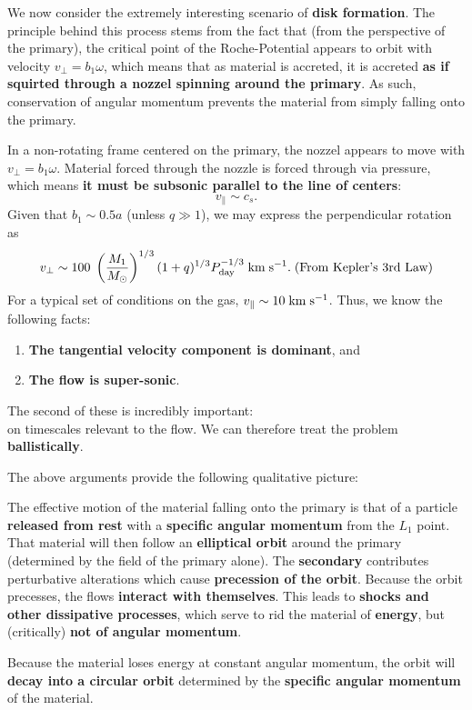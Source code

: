 We now consider the extremely interesting scenario of \textbf{disk formation}. The principle behind this process stems from the fact that (from the perspective of the primary), the critical point of the Roche-Potential appears to orbit with velocity $v_\perp = b_1\omega$, which means that as material is accreted, it is accreted \textbf{as if squirted through a nozzel spinning around the primary}. As such, conservation of angular momentum prevents the material from simply falling onto the primary.
\par
In a non-rotating frame centered on the primary, the nozzel appears to move with $v_\perp = b_1\omega$. Material forced through the nozzle is forced through via pressure, which means \textbf{it must be subsonic parallel to the line of centers}:
\[
v_\parallel \sim c_s.
\]
Given that $b_1 \sim 0.5a$ (unless $q \gg 1$), we may express the perpendicular rotation as
\[
v_\perp \sim 100\; \left(\frac{M_1}{M_\odot}\right)^{1/3} (1+q)^{1/3} P_{\rm day}^{-1/3} \;{\rm km\;s^{-1}}.\;\text{(From Kepler's 3rd Law)}
\]
For a typical set of conditions on the gas, $v_\parallel \sim 10\;{\rm km\;s^{-1}}$. Thus, we know the following facts:
\begin{enumerate}
    \item \textbf{The tangential velocity component is dominant}, and
    \item \textbf{The flow is super-sonic}.
\end{enumerate}
The second of these is incredibly important:\\
 on timescales relevant to the flow. We can therefore treat the problem \textbf{ballistically}.
\par
The above arguments provide the following qualitative picture:
\vspace{0.5cm}
\begin{bigidea}
    The effective motion of the material falling onto the primary is that of a particle \textbf{released from rest} with a \textbf{specific angular momentum} from the $L_1$ point. That material will then follow an \textbf{elliptical orbit} around the primary (determined by the field of the primary alone). The \textbf{secondary} contributes perturbative alterations which cause \textbf{precession of the orbit}. Because the orbit precesses, the flows \textbf{interact with themselves}. This leads to \textbf{shocks and other dissipative processes}, which serve to rid the material of \textbf{energy}, but (critically) \textbf{not of angular momentum}. 
\par
Because the material loses energy at constant angular momentum, the orbit will \textbf{decay into a circular orbit} determined by the \textbf{specific angular momentum} of the material.
\end{bigidea}
